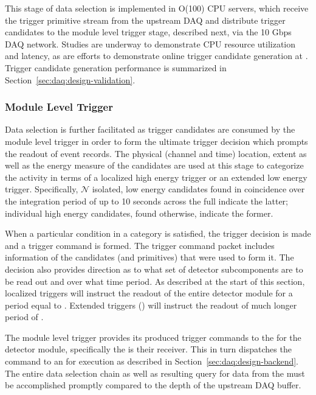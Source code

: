 This stage of data selection is implemented in O(100) CPU servers, which receive
the trigger primitive stream from the upstream DAQ and distribute trigger
candidates to the module level trigger stage, described next, via the 10 Gbps
DAQ network.
Studies are underway to demonstrate CPU resource utilization and latency, as are
efforts to demonstrate online trigger candidate generation at
.
Trigger candidate generation performance is summarized in
Section~\ref{sec:daq:design-validation}. 


\subsubsection{Module Level Trigger}

Data selection is further facilitated as trigger candidates are consumed by the
module level trigger in order to form the ultimate trigger decision which
prompts the readout of event records. 
The physical (channel and time) location, extent as well as the energy measure
of the candidates are used at this stage to categorize the activity in terms of
a localized high energy trigger or an extended low energy trigger. 
Specifically, $\mathcal{N}$ isolated, low energy candidates found in coincidence
over the integration period of up to 10 seconds across the full
 indicate the latter; individual high energy candidates, found
otherwise, indicate the former.

When a particular condition in a category is satisfied, the trigger decision is
made and a trigger command is formed. 
The trigger command packet includes information of the candidates (and
primitives) that were used to form it. 
The decision also provides direction as to what set of detector subcomponents
are to be read out and over what time period. 
As described at the start of this section, localized triggers will instruct the
readout of the entire detector module for a period equal to \dpreadout.
Extended triggers () will instruct the readout of much longer period
of \snbtime.

The module level trigger provides its produced trigger commands to the
 for the detector module, specifically the  is
their receiver.
This in turn dispatches the command to an  for execution as described
in Section~\ref{sec:daq:design-backend}.
The entire data selection chain as well as resulting query for data from the
 must be accomplished promptly compared to the depth of the
upstream DAQ buffer.

